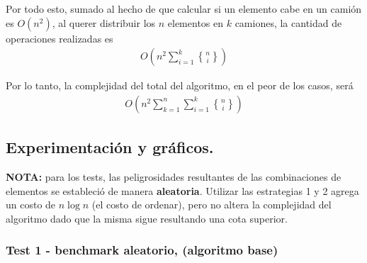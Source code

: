 Por todo esto, sumado al hecho de que calcular si un elemento cabe en un
camión es $O(n^2)$, al querer distribuir los $n$ elementos en $k$ camiones,
la cantidad de operaciones realizadas es
\begin{align*}
  O(n^2 \sum_{i=1}^k {n \brace i})
\end{align*}

Por lo tanto, la complejidad del total del algoritmo, en el peor de los
casos, será
\begin{align*}
  O(n^2 \sum_{k=1}^n \sum_{i=1}^k {n \brace i})
\end{align*}

%
%
%
%

\vspace*{0.75cm} \noindent


\newpage
\subsection{Experimentación y gráficos.}

\textbf{NOTA:} para los tests, las peligrosidades resultantes de las combinaciones de
elementos se estableció de manera \textbf{aleatoria}. Utilizar las estrategias 1 y 2
agrega un costo de $n \log n$ (el costo de ordenar), pero no altera la complejidad del
algoritmo dado que la misma sigue resultando una cota superior.

\vspace*{0.3cm}

\subsubsection{Test 1 - benchmark aleatorio, (algoritmo base)}


